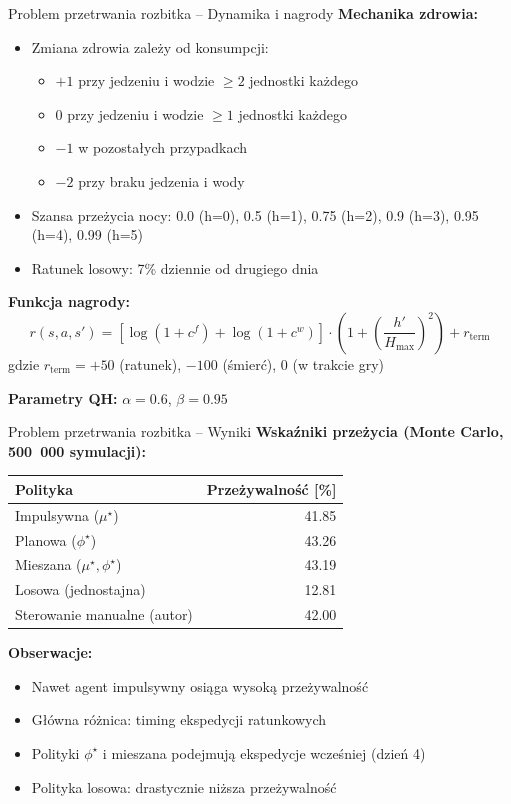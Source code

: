 \begin{frame}{Problem przetrwania rozbitka -- Dynamika i nagrody}
\textbf{Mechanika zdrowia:}
\begin{itemize}
    \item Zmiana zdrowia zależy od konsumpcji:
    \begin{itemize}
        \item $+1$ przy jedzeniu i wodzie $\ge 2$ jednostki każdego
        \item $0$ przy jedzeniu i wodzie $\ge 1$ jednostki każdego
        \item $-1$ w pozostałych przypadkach
        \item $-2$ przy braku jedzenia i wody
    \end{itemize}
    \item Szansa przeżycia nocy: 0.0 (h=0), 0.5 (h=1), 0.75 (h=2), 0.9 (h=3), 0.95 (h=4), 0.99 (h=5)
    \item Ratunek losowy: 7\% dziennie od drugiego dnia
\end{itemize}

\vspace{0.5em}
\textbf{Funkcja nagrody:}
\[
r(s,a,s') = \left[\log(1 + c^f) + \log(1 + c^w)\right] \cdot \left(1 + \left(\frac{h'}{H_{\max}}\right)^2\right) + r_{\text{term}}
\]
gdzie $r_{\text{term}} = +50$ (ratunek), $-100$ (śmierć), $0$ (w trakcie gry)

\vspace{0.5em}
\textbf{Parametry QH:} $\alpha = 0.6$, $\beta = 0.95$
\end{frame}

\begin{frame}{Problem przetrwania rozbitka -- Wyniki}
\textbf{Wskaźniki przeżycia (Monte Carlo, 500~000 symulacji):}

\vspace{0.3em}
\begin{table}[h!]
\centering
\begin{tabular}{l r}
\toprule
Polityka & Przeżywalność [\%] \\
\midrule
Impulsywna ($\mu^\star$) & 41.85 \\
Planowa ($\phi^\star$) & 43.26 \\
Mieszana ($\mu^\star, \phi^\star$) & 43.19 \\
Losowa (jednostajna) & 12.81 \\
Sterowanie manualne (autor) & 42.00 \\
\bottomrule
\end{tabular}
\end{table}

\vspace{0.5em}
\textbf{Obserwacje:}
\begin{itemize}
    \item Nawet agent impulsywny osiąga wysoką przeżywalność
    \item Główna różnica: timing ekspedycji ratunkowych
    \item Polityki $\phi^\star$ i mieszana podejmują ekspedycje wcześniej (dzień 4)
    \item Polityka losowa: drastycznie niższa przeżywalność
\end{itemize}
\end{frame}

